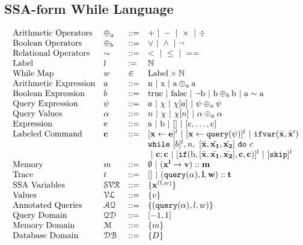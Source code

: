 \documentclass[a4paper,11pt]{article}
\begin{document}
\subsection{SSA-form While Language}
\[
\begin{array}{llll}
 \mbox{Arithmetic Operators} 
& \oplus_a & ::= & + ~|~ - ~|~ \times 
%
~|~ \div \\  
\mbox{Boolean Operators} 
& \oplus_b & ::= & \lor ~|~ \land ~|~ \neg
\\
\mbox{Relational Operators} 
& \sim & ::= & < ~|~ \leq ~|~ == 
\\  
%
\mbox{Label} 
& l & := & \mathbb{N} 
\\ 
%
\mbox{While Map} 
& w & \in & \mbox{Label} \times \mathbb{N} 
\\
%
\mbox{Arithmetic Expression} 
& \saexpr & ::= & 
\textrm{n} ~|~ \textrm{x} ~|~ \saexpr \oplus_a \saexpr  
\\
%
\mbox{Boolean Expression} & \bexpr & ::= & 
	\textrm{true} ~|~ \textrm{false}  ~|~ \neg \sbexpr
	 ~|~ \sbexpr \oplus_b \sbexpr
	~|~ \saexpr \sim \saexpr 
	\\
%
\mbox{Query Expression} & \qexpr & ::= 
& { \aexpr ~|~ \chi ~|~ \chi[\aexpr] ~|~ \qexpr \oplus_a \qexpr} 
\\
%
\mbox{Query Values} & \qval & ::= 
& { n ~|~ \chi ~|~ \chi[n] ~|~ \qval \oplus_a  \qval }
\\
%
\mbox{Expression} & \sexpr & ::= & \saexpr \sep \sbexpr ~|~ [] ~|~ [\expr, \dots, \expr]
\\	
%
\mbox{Labeled Command} 
& \ssa{c} & ::= &   [\assign {\ssa{x}}{ \ssa{\expr}}]^{l} ~|~  [\assign {\ssa{x} } {\ssa{\query(\qexpr)}}]^{l}
%
~|~  {{\eifvar(\bar{\ssa{x}}, \bar{\ssa{x}}')}} 
\\ 
&&& 
{\ewhile ~ [ b ]^{l} , n,
~ 
[\bar{\ssa{x}}, \bar{\ssa{x_1}}, \bar{\ssa{x_2}}] 
~ \edo ~  c }
\\
&&&
~|~ \ssa{c};\ssa{c}  
~|~ [\eif(\sbexpr, [\bar{\ssa{x}}, \bar{\ssa{x_1}}, \bar{\ssa{x_2}}] , \ssa{c}, \ssa{c})]^l 
~|~ [\eskip]^{l} 
\\
%
\mbox{Memory} 
& m & ::= & \emptyset ~|~ \ssa{ ({x^{l}} \to v) :: m } 
\\
%
\mbox{Trace} & t 
& ::= & [] ~|~ \ssa{{(\query(\qval), l , w ) :: t}}
\\
%
\mbox{SSA Variables} 
& \mathcal{SVR}  & ::= & \{ \ssa{x}^{(l,w)} \}
%
\\
\mbox{Values} 
& \mathcal{VL}  & ::= & \{ v \}
%
\\
\mbox{Annotated Queries} & \mathcal{AQ}  & 
::= & {\{ (\query(\qval), l , w )  \} }
\\
%
\mbox{{Query Domain}}
& \qdom & ::= & {[-1,1]}
\\
%
\mbox{{Memory Domain}}
& \memdom & ::= & {\{m\}}
\\
%
\mbox{{Database Domain}}
& \dbdom & ::= & {\{D\}}
%
\end{array}
\]
\end{document}
